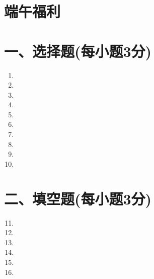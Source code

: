\documentclass[11pt]{article}
\begin{document}
\section*{\centering 端午福利}
\section*{\normalsize 一、选择题(每小题3分)}
\begin{enumerate}\setcounter{enumi}{0}
    \item %
    \item %
    \item %
    \item %
    \item %
    \item %
    \item %
    \item %
    \item %
    \item %
\end{enumerate}
\section*{\normalsize 二、填空题(每小题3分)}
\begin{enumerate}\setcounter{enumi}{10}
    \item %
    \item %
    \item %
    \item %
    \item %
    \item %
\end{enumerate}
\end{document}
